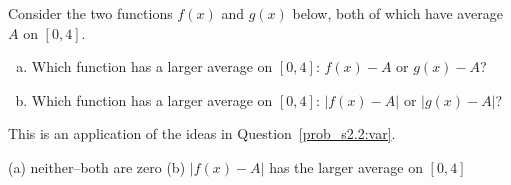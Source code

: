 

\begin{Mquestion}
Consider the two functions $f(x)$ and $g(x)$ below, both of which have average $A$ on $[0,4]$.
\begin{center}
\end{center}
\begin{enumerate}[(a)]
\item Which function has a larger average on $[0,4]$:  $f(x)-A$ or  $g(x)-A$?
\item Which function has a larger average on $[0,4]$:  $|f(x)-A|$ or  $|g(x)-A|$?
\end{enumerate}
\end{Mquestion}
\begin{hint}
This is an application of the ideas in Question~\ref{prob_s2.2:var}.
\end{hint}
\begin{answer}
(a) neither--both are zero
\qquad
(b) $|f(x)-A|$ has the larger average on $[0,4]$
\end{answer}

